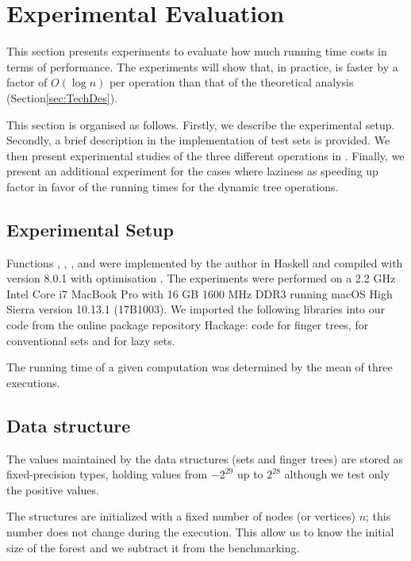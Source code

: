 \section{Experimental Evaluation} 
\label{sec:Eval} 


This section presents experiments to evaluate how much running time costs in terms of performance. The experiments will show that, in practice, \dyntset is faster by a factor of $O(\log n)$ per operation than that of the theoretical analysis (Section\ref{sec:TechDes}).

This section is organised as follows. Firstly, we describe the experimental setup. Secondly, a brief description in the implementation of test sets is provided. We then present experimental studies of the three different operations in \dyntset. Finally, we present an additional experiment for the cases where laziness as speeding up factor in favor of the running times for the dynamic tree operations.


\subsection{Experimental Setup}
Functions \link, \cut, \conn,  and  were implemented by the author in Haskell and compiled with  version 8.0.1 with optimisation . The experiments were performed on a 2.2 GHz Intel Core i7 MacBook Pro with 16 GB 1600 MHz DDR3 running macOS High Sierra version 10.13.1 (17B1003). We imported the following libraries into our code from the online package repository Hackage: \cite{HaskellFT} code for finger trees, \cite{HaskellSet} for conventional sets and \cite{HaskellEdison} for lazy sets.

The running time of a given computation was determined by the mean of three executions.

\subsection{Data structure} 

The values maintained by the data structures (sets and finger trees) are stored as fixed-precision  types, holding values from $-2^{29}$ up to $2^{28}$ although we test only the positive values.

The structures are initialized with a fixed number of nodes (or vertices) $n$; this number does not change during the execution. This allow us to know the initial size of the forest and we subtract it from the benchmarking.

